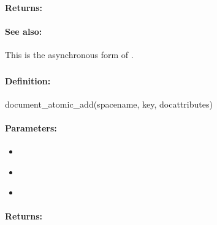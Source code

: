 \paragraph{Returns:}


\paragraph{See also:}  This is the asynchronous form of .

\pagebreak
\subsubsection{}
\label{api:ruby:document_atomic_add}


\paragraph{Definition:}
\begin{rubycode}
document_atomic_add(spacename, key, docattributes)
\end{rubycode}

\paragraph{Parameters:}
\begin{itemize}[noitemsep]
\item {}\\

\item {}\\

\item {}\\

\end{itemize}

\paragraph{Returns:}


\pagebreak
\subsubsection{}
\label{api:ruby:async_document_atomic_add}


